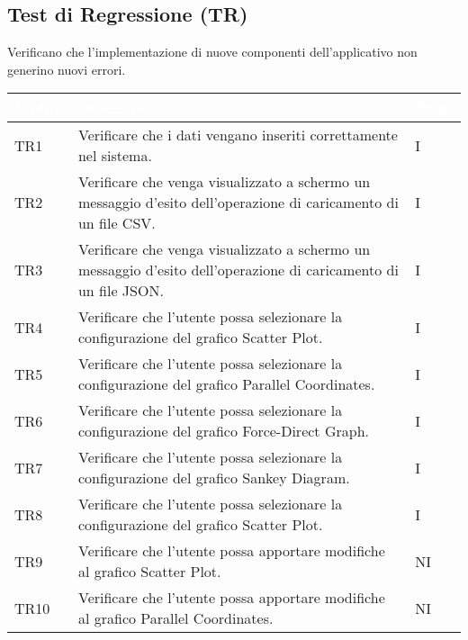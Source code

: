     \subsection{Test di Regressione (TR)} Verificano che l'implementazione di nuove componenti dell'applicativo non generino nuovi errori.
    \begin{center}
        \renewcommand\arraystretch{1.5}
        \centering
        \begin{longtable}{|p{1.5cm}|p{11cm}|p{1cm}|}
        \hline
        \rowcolor[HTML]{036400}
        \textcolor{white}{\textbf{Codice}} & \textcolor{white}{\textbf{Descrizione}} & \textcolor{white}{\textbf{Stato}} \\ \hline
            \rowcolor[HTML]{C0C0C0}
            TR1 & Verificare che i dati vengano inseriti correttamente nel sistema. & I\\ \hline
            \rowcolor[HTML]{EFEFEF}
            TR2 & Verificare che venga visualizzato a schermo un messaggio d’esito dell’operazione di caricamento di un file CSV.& I\\ \hline
            \rowcolor[HTML]{C0C0C0}
            TR3 & Verificare che venga visualizzato a schermo un messaggio d’esito dell’operazione di caricamento di un file JSON.& I\\ \hline
            \rowcolor[HTML]{EFEFEF}
            TR4 & Verificare che l’utente possa selezionare la configurazione del grafico Scatter Plot. & I\\ \hline
            \rowcolor[HTML]{C0C0C0}
            TR5 & Verificare che l’utente possa selezionare la configurazione del grafico Parallel Coordinates. & I\\ \hline
            \rowcolor[HTML]{EFEFEF}
            TR6 & Verificare che l’utente possa selezionare la configurazione del grafico Force-Direct Graph. & I\\ \hline
            \rowcolor[HTML]{C0C0C0}
            TR7 & Verificare che l’utente possa selezionare la configurazione del grafico Sankey Diagram. & I\\ \hline
            \rowcolor[HTML]{EFEFEF}
            TR8 & Verificare che l’utente possa selezionare la configurazione del grafico Scatter Plot. & I\\ \hline
            \rowcolor[HTML]{C0C0C0}
            TR9 & Verificare che l’utente possa apportare modifiche al grafico Scatter Plot. & NI\\ \hline
            \rowcolor[HTML]{EFEFEF}
            TR10 & Verificare che l’utente possa apportare modifiche al grafico Parallel Coordinates. & NI\\ \hline

\end{longtable}
\end{center}
